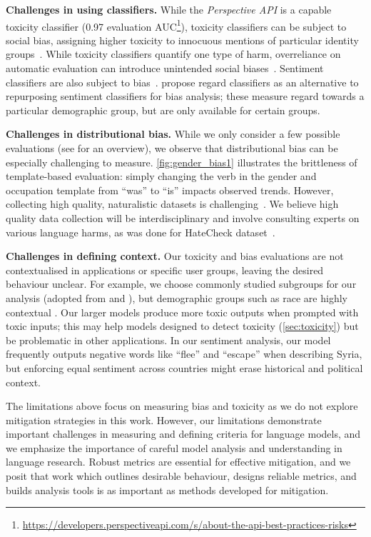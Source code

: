 \documentclass[11pt, a4paper, logo, internal, copyright, nonumbering]{deepmind}
\newcommand{\perspectiveapi}{\textit{Perspective API}\xspace}
\begin{document}
\textbf{Challenges in using classifiers.} 
While the \perspectiveapi is a capable toxicity classifier (0.97 evaluation AUC\footnote{\url{https://developers.perspectiveapi.com/s/about-the-api-best-practices-risks}}), toxicity classifiers can be subject to social bias, assigning higher toxicity to innocuous mentions of particular identity groups~\citep{Dixon2018Measuring,rottgerhatecheck}.
While toxicity classifiers quantify one type of harm, overreliance on automatic evaluation can introduce unintended social biases~\citep{xu2021detoxifying,welbl2021challenges}.  
Sentiment classifiers are also subject to bias~\citep{kiritchenko2018sentiment}.  
\citet{sheng2019woman} propose regard classifiers as an alternative to repurposing sentiment classifiers for bias analysis; these measure regard towards a particular demographic group, but are only available for certain groups.

\textbf{Challenges in distributional bias.} While we only consider a few possible evaluations (see \cite{sheng2021societal} for an overview), we observe that distributional bias can be especially challenging to measure.
\autoref{fig:gender_bias1} illustrates the brittleness of template-based evaluation: simply changing the verb in the gender and occupation template from ``was'' to ``is'' impacts observed trends.
However, collecting high quality, naturalistic datasets is challenging~\citep{blodgett2021stereotyping}.
We believe high quality data collection will be interdisciplinary and involve consulting experts on various language harms, as was done for HateCheck dataset~\citep{rottgerhatecheck}.

\textbf{Challenges in defining context.}
Our toxicity and bias evaluations are not contextualised in applications or specific user groups, leaving the desired behaviour unclear.
For example, we choose commonly studied subgroups for our analysis (adopted from \cite{gpt3} and \cite{huang2020reducing}), but demographic groups such as race are highly contextual \citep{Hanna_2020}.
Our larger models produce more toxic outputs when prompted with toxic inputs; this may help models designed to detect toxicity (\autoref{sec:toxicity}) but be problematic in other applications. 
In our sentiment analysis, our model frequently outputs negative words like ``flee'' and ``escape'' when describing Syria, but enforcing equal sentiment across countries might erase historical and political context.

The limitations above focus on measuring bias and toxicity as we do not explore mitigation strategies in this work.
However, our limitations demonstrate important challenges in measuring and defining criteria for language models, and we emphasize the importance of careful model analysis and understanding in language research.
Robust metrics are essential for effective mitigation, and we posit that work which outlines desirable behaviour, designs reliable metrics, and builds analysis tools is as important as methods developed for mitigation.
\end{document}
